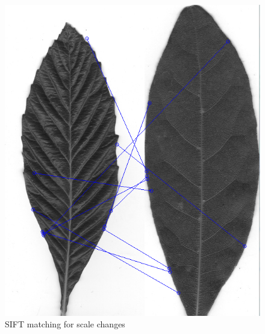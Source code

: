 \documentclass[xcolor=table]{beamer}
\begin{document}
\begin{frame}
\begin{figure}[htbp]
\begin{minipage}[c]{.45\linewidth}
\begin{center}
	\includegraphics[scale=0.20]{Capture.png}
	\caption{SIFT matching for scale changes}
	\label{figure:Illustration}
      \end{center}
    \end{minipage}
  \end{figure}
\end{frame}
\end{document}
